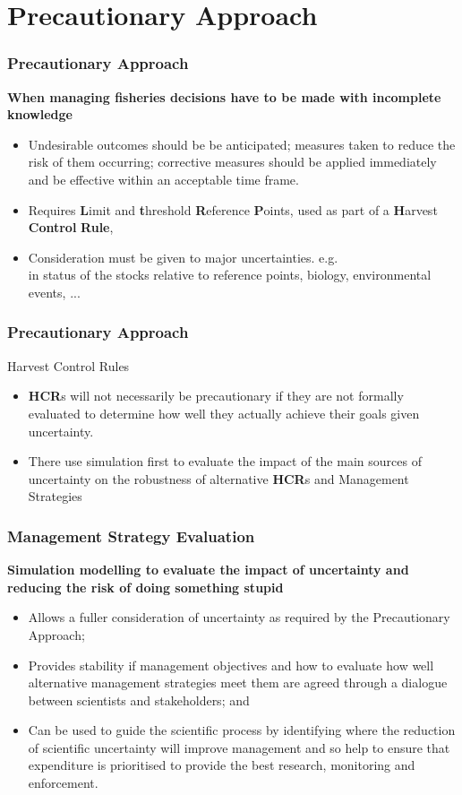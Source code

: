\documentclass{beamer}
\newcommand\Fontviii{\fontsize{8}{10}\selectfont}
\begin{document}
\section{Precautionary Approach}
\begin{frame}\frametitle{Precautionary Approach} 
  \smallskip\textbf{When managing fisheries decisions have to be made with incomplete knowledge}\smallskip
  \Fontviii
  \begin{itemize} %
     \item Undesirable outcomes should be be anticipated; measures taken to reduce the risk of them occurring; corrective measures should be applied immediately and be effective within an acceptable time frame. 
     \item Requires \textbf{L}imit and \textbf{t}hreshold \textbf{R}eference \textbf{P}oints, used as part of a \textbf{H}arvest \textbf{Control} \textbf{Rule}, 
     \item Consideration must be given to major uncertainties. e.g. \\ in status of the stocks relative to reference points, biology, environmental events, ...
    \end{itemize}
\end{frame}

    
\begin{frame}\frametitle{Precautionary Approach} 
  \smallskip Harvest Control Rules\smallskip\\
  \Fontviii
  \begin{itemize} %
    \item \textbf{HCR}s will not necessarily be precautionary if they are not formally evaluated to determine how well they actually achieve their goals given uncertainty.
    \item There use simulation first to evaluate the impact of the main sources of uncertainty on the robustness of alternative \textbf{HCR}s and Management Strategies
  \end{itemize}
\end{frame}

\begin{frame}\frametitle{Management Strategy Evaluation} 
  \smallskip\textbf{Simulation modelling to evaluate the impact of uncertainty and reducing the risk of doing something stupid}\smallskip 
  \Fontviii
  \begin{itemize} %
     \item Allows a fuller consideration of uncertainty as required by the Precautionary Approach; 
     \item Provides stability if management objectives and how to evaluate how well alternative  
	   management strategies meet them are agreed through a dialogue between scientists and stakeholders; and 
     \item Can be used to guide the scientific process by identifying where the reduction of scientific 
	   uncertainty will improve management and so help to ensure that expenditure is prioritised to provide 
	   the best research, monitoring and enforcement. 
  \end{itemize}
\end{frame}
\end{document}
